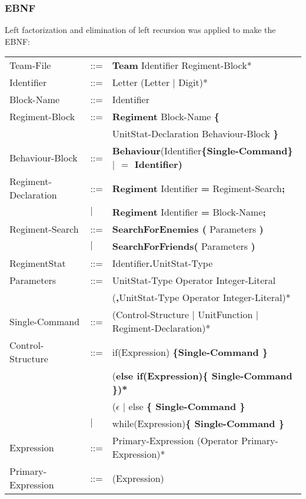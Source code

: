 	\subsubsection{EBNF}
		Left factorization and elimination of left recursion was applied to make the EBNF: \\
		\begin{center}
			\begin{longtable}{ l l l }
				\endfirsthead
				\endhead
		Team-File					&	::=	&{\bf Team} Identifier Regiment-Block*\\
		Identifier					&	::=	&Letter (Letter $\mid$ Digit)*\\
		Block-Name					&	::=	&Identifier\\
		Regiment-Block				&	::=	&{\bf Regiment} Block-Name {\bf \{ } \\
									&		&UnitStat-Declaration Behaviour-Block \bf{\} }\\
		Behaviour-Block				&	::=	&{\bf Behaviour}(Identifier\bf{\{}Single-Command\bf{\}} $\mid$ {\bf $=$} Identifier)\\
		Regiment-Declaration		&	::=	&{\bf Regiment} Identifier {\bf =} Regiment-Search{\bf ;}\\
									&$\mid$	&{\bf Regiment} Identifier {\bf =} Block-Name{\bf ;}\\
		Regiment-Search				&	::=	&{\bf SearchForEnemies (} Parameters {\bf )}\\
									&$\mid$	&{\bf SearchForFriends(} Parameters {\bf )}\\
		RegimentStat				&	::=	&Identifier{\bf.}UnitStat-Type \\
		Parameters					&	::=	&UnitStat-Type Operator Integer-Literal\\
									&		&({\bf ,}UnitStat-Type Operator Integer-Literal)*\\
		Single-Command				&	::=	&(Control-Structure $\mid$ UnitFunction $\mid$ Regiment-Declaration)*\\		
		Control-Structure			&	::=	&if(Expression) \bf{\{}Single-Command \bf{\}}\\
									&		&(\bf{else if(}Expression\bf{)\{ }Single-Command\bf{ \}})* \\
									&		&($\epsilon$ $\mid$ else \bf{\{ }Single-Command \bf{\} }\\					   
									&$\mid$	&while(Expression)\bf{\{ } Single-Command \bf{\}}\\
		Expression					&	::=	&Primary-Expression (Operator Primary-Expression)*\\
		Primary-Expression			&	::=	&(Expression)\\

\end{longtable}
\end{center}
